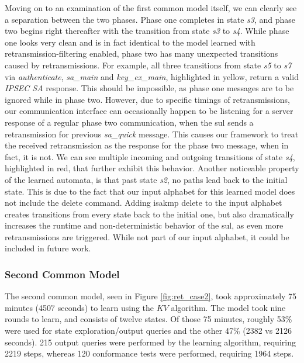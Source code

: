 Moving on to an examination of the first common model itself, we can clearly see a separation between the two phases. Phase one completes in state \emph{s3}, and phase two begins right thereafter with the transition from state \emph{s3} to \emph{s4}. While phase one looks very clean and is in fact identical to the model learned with retransmission-filtering enabled, phase two has many unexpected transitions caused by retransmissions. For example, all three transitions from state \emph{s5} to \emph{s7} via \emph{authenticate}, \emph{sa\_main} and \emph{key\_ex\_main}, highlighted in yellow, return a valid \emph{IPSEC SA} response. This should be impossible, as phase one messages are to be ignored while in phase two. However, due to specific timings of retransmissions, our communication interface can occasionally happen to be listening for a server response of a regular phase two communication, when the \ac{sul} sends a retransmission for previous \emph{sa\_quick} message. This causes our framework to treat the received retransmission as the response for the phase two message, when in fact, it is not. We can see multiple incoming and outgoing transitions of state \emph{s4}, highlighted in red, that further exhibit this behavior.
Another noticeable property of the learned automata, is that past state \emph{s2}, no paths lead back to the initial state. This is due to the fact that our input alphabet for this learned model does not include the delete command. Adding \ac{isakmp} delete to the input alphabet creates transitions from every state back to the initial one, but also dramatically increases the runtime and non-deterministic behavior of the \ac{sul}, as even more retransmissions are triggered. While not part of our input alphabet, it could be included in future work.


\subsubsection*{Second Common Model}

The second common model, seen in Figure \ref{fig:ret_case2}, took approximately 75 minutes (4507 seconds) to learn using the $KV$ algorithm. The model took nine rounds to learn, and consists of twelve states. Of those 75 minutes, roughly 53\% were used for state exploration/output queries and the other 47\% (2382 vs 2126 seconds). 215 output queries were performed by the learning algorithm, requiring 2219 steps, whereas 120 conformance tests were performed, requiring 1964 steps. 

